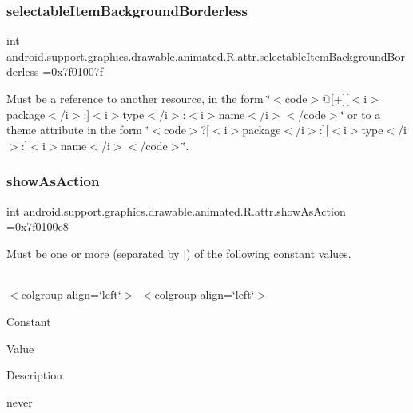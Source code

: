 \subsubsection{\texorpdfstring{selectable\+Item\+Background\+Borderless}{selectableItemBackgroundBorderless}}
{\footnotesize\ttfamily int android.\+support.\+graphics.\+drawable.\+animated.\+R.\+attr.\+selectable\+Item\+Background\+Borderless =0x7f01007f\hspace{0.3cm}{\ttfamily [static]}}

Must be a reference to another resource, in the form \char`\"{}$<$code$>$@\mbox{[}+\mbox{]}\mbox{[}$<$i$>$package$<$/i$>$\+:\mbox{]}$<$i$>$type$<$/i$>$\+:$<$i$>$name$<$/i$>$$<$/code$>$\char`\"{} or to a theme attribute in the form \char`\"{}$<$code$>$?\mbox{[}$<$i$>$package$<$/i$>$\+:\mbox{]}\mbox{[}$<$i$>$type$<$/i$>$\+:\mbox{]}$<$i$>$name$<$/i$>$$<$/code$>$\char`\"{}. \mbox{\label{classandroid_1_1support_1_1graphics_1_1drawable_1_1animated_1_1R_1_1attr_a331e00669a6d6731aa9689c0c8f9299c}} 
\subsubsection{\texorpdfstring{show\+As\+Action}{showAsAction}}
{\footnotesize\ttfamily int android.\+support.\+graphics.\+drawable.\+animated.\+R.\+attr.\+show\+As\+Action =0x7f0100c8\hspace{0.3cm}{\ttfamily [static]}}

Must be one or more (separated by \textquotesingle{}$\vert$\textquotesingle{}) of the following constant values.

\tabulinesep=1mm
\begin{longtabu} spread 0pt [c]{*{0}{|X[-1]}|}
\hline
\end{longtabu}
$<$colgroup align=\char`\"{}left\char`\"{}$>$ $<$colgroup align=\char`\"{}left\char`\"{}$>$ 

Constant

Value

Description 

{\ttfamily never}


